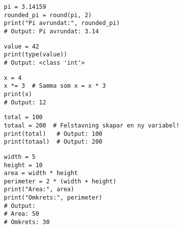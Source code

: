 \begin{lstlisting}[title=Exempel 16: Avrundning med variabel]
pi = 3.14159
rounded_pi = round(pi, 2)
print("Pi avrundat:", rounded_pi)
# Output: Pi avrundat: 3.14
\end{lstlisting}

\begin{lstlisting}[title=Exempel 17: Kontrollera en variabels datatyp]
value = 42
print(type(value))
# Output: <class 'int'>
\end{lstlisting}

\begin{lstlisting}[title=Exempel 18: Multiplicera och uppdatera samtidigt]
x = 4
x *= 3  # Samma som x = x * 3
print(x)
# Output: 12
\end{lstlisting}

\begin{lstlisting}[title=Exempel 19: Förväxla inte namn på variabler]
total = 100
totaal = 200  # Felstavning skapar en ny variabel!
print(total)   # Output: 100
print(totaal)  # Output: 200
\end{lstlisting}

\begin{lstlisting}[title=Exempel 20: Variabler i längre beräkningar]
width = 5
height = 10
area = width * height
perimeter = 2 * (width + height)
print("Area:", area)
print("Omkrets:", perimeter)
# Output:
# Area: 50
# Omkrets: 30
\end{lstlisting}
